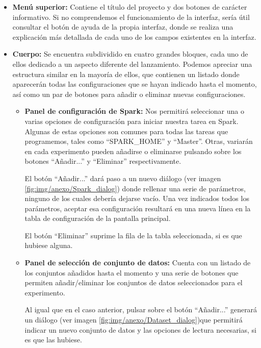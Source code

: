 \begin{itemize}
	\item \textbf{Menú superior:} Contiene el título del proyecto y dos botones de carácter informativo. Si no comprendemos el funcionamiento de la interfaz, sería útil consultar el botón de ayuda de la propia interfaz, donde se realiza una explicación más detallada de cada uno de los campos existentes en la interfaz.
	\item \textbf{Cuerpo:} Se encuentra subdividido en cuatro grandes bloques, cada uno de ellos dedicado a un aspecto diferente del lanzamiento. Podemos apreciar una estructura similar en la mayoría de ellos, que contienen un listado donde aparecerán todas las configuraciones que se hayan indicado hasta el momento, así como un par de botones para añadir o eliminar nuevas configuraciones.
		\begin{itemize}
			\item \textbf{Panel de configuración de Spark:} Nos permitirá seleccionar una o varias opciones de configuración para iniciar nuestra tarea en Spark. Algunas de estas opciones son comunes para todas las tareas que programemos, tales como ``SPARK\_HOME'' y ``Master''. Otras, variarán en cada experimento pueden añadirse o eliminarse pulsando sobre los botones ``Añadir...'' y ``Eliminar'' respectivamente.
			
			El botón ``Añadir...'' dará paso a un nuevo diálogo (ver imagen \ref{fig:img/anexo/Spark_dialog}) donde rellenar una serie de parámetros, ninguno de los cuales debería dejarse vacío. Una vez indicados todos los parámetros, aceptar esa configuración resultará en una nueva línea en la tabla de configuración de la pantalla principal.
			
			El botón ``Eliminar'' suprime la fila de la tabla seleccionada, si es que hubiese alguna.
			
			
			\item \textbf{Panel de selección de conjunto de datos:} Cuenta con un listado de los conjuntos añadidos hasta el momento y una serie de botones que permiten añadir/eliminar los conjuntos de datos seleccionados para el experimento.
			
			Al igual que en el caso anterior, pulsar sobre el botón ``Añadir...'' generará un diálogo (ver imagen \ref{fig:img/anexo/Dataset_dialog})que permitirá indicar un nuevo conjunto de datos y las opciones de lectura necesarias, si es que las hubiese.
						

\end{itemize}
\end{itemize}
